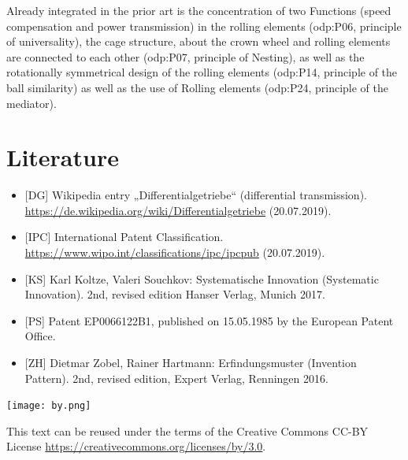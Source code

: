 \documentclass[11pt,a4paper]{article}
\newcommand{\ccnotice}{\vfill
  \begin{minipage}{.22\textwidth}\centering
    \texttt{[image: by.png]}
  \end{minipage}\hfill\begin{minipage}{.77\textwidth}
  This text can be reused under the terms of the Creative Commons CC-BY
  License \url{https://creativecommons.org/licenses/by/3.0}.
  \end{minipage}
}
\begin{document}
Already integrated in the prior art is the concentration of two Functions
(speed compensation and power transmission) in the rolling elements (odp:P06,
principle of universality), the cage structure, about the crown wheel and
rolling elements are connected to each other (odp:P07, principle of Nesting),
as well as the rotationally symmetrical design of the rolling elements
(odp:P14, principle of the ball similarity) as well as the use of Rolling
elements (odp:P24, principle of the mediator).

\section{Literature}
\raggedright
\begin{itemize}
\item{[DG]} Wikipedia entry „Differentialgetriebe“ (differential
  transmission).  \url{https://de.wikipedia.org/wiki/Differentialgetriebe}
  (20.07.2019).
\item{[IPC]} International Patent Classification.
  \url{https://www.wipo.int/classifications/ipc/ipcpub} (20.07.2019).
\item{[KS]} Karl Koltze, Valeri Souchkov: Systematische Innovation (Systematic
  Innovation). 2nd, revised edition Hanser Verlag, Munich 2017.
\item{[PS]} Patent EP0066122B1, published on 15.05.1985 by the
  European Patent Office.
\item{[ZH]} Dietmar Zobel, Rainer Hartmann: Erfindungsmuster (Invention
  Pattern). 2nd, revised edition, Expert Verlag, Renningen 2016.
\end{itemize}

\vfill
\ccnotice
\end{document}
